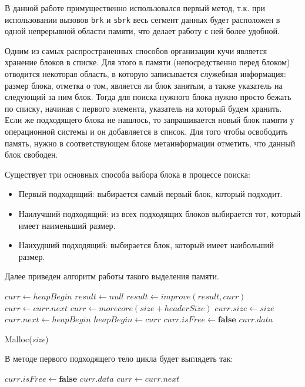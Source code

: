 В данной работе примущественно использовался первый метод, т.к. при использовании
вызовов \lstinline{brk} и \lstinline{sbrk} весь сегмент данных будет расположен 
в одной непрерывной области памяти, что делает работу с ней более удобной.  

Одним из самых распространенных способов организации кучи
является хранение блоков в списке. Для этого в памяти (непосредственно перед блоком)
отводится некоторая область, в которую записывается служебная информация:
размер блока, отметка о том, является ли блок занятым, а также указатель на 
следующий за ним блок. Тогда для поиска нужного блока нужно просто бежать по 
списку, начиная с первого элемента, указатель на который будем хранить. Если же 
подходящего блока не нашлось, то запрашивается новый блок памяти у операционной системы
и он добавляется в список. Для того чтобы освободить память, нужно в соответствующем
блоке метаинформации отметить, что данный блок свободен.

Существует три основных способа выбора блока в процессе поиска:

\begin{itemize}
\item Первый подходящий: выбирается самый первый блок, который подходит.
\item Наилучший подходящий: из всех подходящих блоков выбирается тот, который имеет наименьший размер.
\item Наихудший подходящий: выбирается блок, который имеет наибольший размер.
\end{itemize}  

Далее приведен алгоритм работы такого выделения памяти.

\begin{algorithm}[H]
\begin{algorithmic}[1]
\State $curr\gets heapBegin$
\State $result\gets null$
		\State $result\gets improve(result, curr)$				
	\EndIf
	\State $curr\gets curr.next$
\EndWhile
{}
	\State $curr\gets morecore(size + headerSize)$
	\State $curr.size\gets size$
	\State $curr.next\gets heapBegin$ 
	\State $heapBegin\gets curr$
\EndIf
\State $curr.isFree\gets \textbf{false}$
\State \Return $curr.data$
\end{algorithmic}
\caption{Malloc(\textit{size})}

В методе первого подходящего тело цикла будет выглядеть так:

\begin{algorithmic}[1]
	\State $curr.isFree\gets \textbf{false}$
	\State \Return $curr.data$
\EndIf
\State $curr\gets curr.next$
\end{algorithmic}
\end{algorithm}

